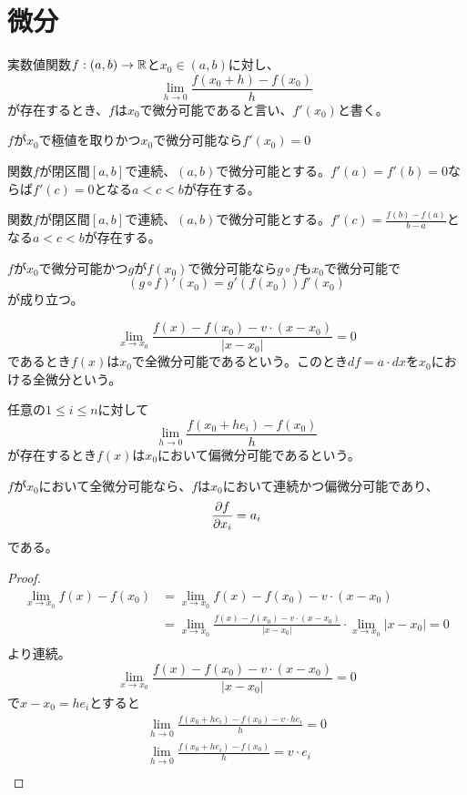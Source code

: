 \section{微分}

\begin{dfn}[常微分]
	実数値関数$f : (a, b) \to \R$と$x_0 \in (a, b)$に対し、
		\[\lim_{h \to 0} \frac{f(x_0 + h) - f(x_0)}{h}\]
	が存在するとき、$f$は$x_0$で微分可能であると言い、$f'(x_0)$と書く。
\end{dfn}
\begin{prop}
	$f$が$x_0$で極値を取りかつ$x_0$で微分可能なら$f'(x_0) = 0$
\end{prop}
\begin{thm}[ロルの定理]
	関数$f$が閉区間$[a, b]$で連続、$(a, b)$で微分可能とする。$f'(a) = f'(b) = 0$ならば$f'(c) = 0$となる$a < c < b$が存在する。
\end{thm}
\begin{thm}[平均値の定理]
	関数$f$が閉区間$[a, b]$で連続、$(a, b)$で微分可能とする。$f'(c) = \frac{f(b) - f(a)}{b - a}$となる$a < c < b$が存在する。
\end{thm}
\begin{prop}[合成関数の微分]
	$f$が$x_0$で微分可能かつ$g$が$f(x_0)$で微分可能なら$g\circ f$も$x_0$で微分可能で
		\[(g\circ f)'(x_0) = g'(f(x_0))f'(x_0)\]
	が成り立つ。
\end{prop}
\begin{prop}[逆関数の微分]
\end{prop}

\begin{dfn}[全微分]
		\[\lim_{x \to x_0} \frac{f(x) - f(x_0) - v \cdot (x - x_0)}{|x - x_0|} = 0\]
	であるとき$f(x)$は$x_0$で全微分可能であるという。このとき$df = a \cdot dx$を$x_0$における全微分という。
\end{dfn}
\begin{dfn}[偏微分]
	任意の$1 \leq i \leq n$に対して
		\[\lim_{h \to 0} \frac{f(x_0 + he_i) - f(x_0)}{h}\]
	が存在するとき$f(x)$は$x_0$において偏微分可能であるという。
\end{dfn}
\begin{prop}
	$f$が$x_0$において全微分可能なら、$f$は$x_0$において連続かつ偏微分可能であり、
		\[\pd[f]{x_i} = a_i\]
	である。
\end{prop}
\begin{proof}
	\begin{align*}
		\lim_{x \to x_0} f(x) - f(x_0) 
		&= \lim_{x \to x_0} f(x) - f(x_0) - v \cdot (x - x_0)\\
		&= \lim_{x \to x_0} \frac{f(x) - f(x_0) - v \cdot (x - x_0)}{|x - x_0|} \cdot \lim_{x \to x_0} {|x - x_0|} = 0\\
	\end{align*}
	より連続。
		\[\lim_{x \to x_0} \frac{f(x) - f(x_0) - v \cdot (x - x_0)}{|x - x_0|} = 0\]
	で$x - x_0 = he_i$とすると
	\begin{align*}
		\lim_{h \to 0} \frac{f(x_0 + he_i) - f(x_0) - v \cdot he_i}{h} = 0\\
		\lim_{h \to 0} \frac{f(x_0 + he_i) - f(x_0)}{h} = v \cdot e_i\\
	\end{align*}
\end{proof}

